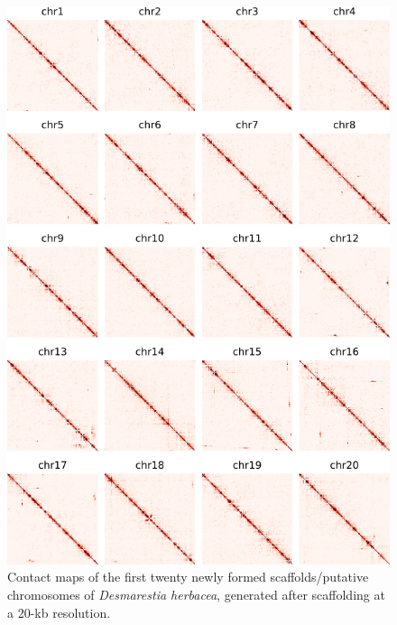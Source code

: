 \begin{suppsection}
\begin{figure}[ht]
\centering
    \includegraphics[width=13.5cm]{fig/instagraal/s5.png}
    \caption{Contact maps of the first twenty newly formed scaffolds/putative chromosomes of \textit{Desmarestia herbacea}, generated after scaffolding at a 20-kb resolution.}
    \label{fig:instagraal_s5}
\end{figure}


\end{suppsection}
